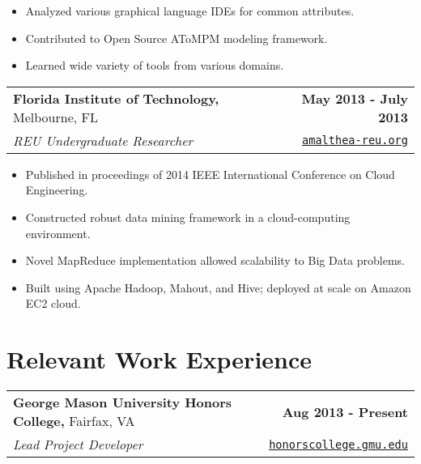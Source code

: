\documentclass[letterpaper]{article}
\newenvironment{details}
{\begin{itemize}}
{\end{itemize}}
\begin{document}

  \begin{details}
  \item Analyzed various graphical language IDEs for common attributes.
  \item Contributed to Open Source AToMPM modeling framework.
  \item Learned wide variety of tools from various domains.
  \end{details}

  \noindent
  \begin{tabularx}{\textwidth}{@{}X r@{}}
    \textbf{Florida Institute of Technology,} Melbourne, FL & \textbf{May 2013 - July 2013} \\
    \emph{REU Undergraduate Researcher} & \texttt{\href{amalthea-reu.org}{amalthea-reu.org}}
  \end{tabularx}


  \begin{details}
  \item Published in proceedings of 2014 IEEE International Conference on Cloud Engineering.
  \item Constructed robust data mining framework in a cloud-computing environment.
  \item Novel MapReduce implementation allowed scalability to Big Data problems.
  \item Built using Apache Hadoop, Mahout, and Hive; deployed at scale on Amazon EC2 cloud.
  \end{details}


  \section{Relevant Work Experience}

  \noindent
  \begin{tabularx}{\textwidth}{@{}X r@{}}
    \textbf{George Mason University Honors College,} Fairfax, VA & \textbf{Aug 2013 - Present} \\
    \emph{Lead Project Developer} & \texttt{\href{http://honorscollege.gmu.edu/collegeresearch}{honorscollege.gmu.edu}}
  \end{tabularx}
\end{document}
